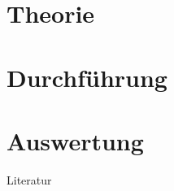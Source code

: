 \section{Theorie}

\section{Durchführung}

\section{Auswertung}

\parskip 340pt
\Large{Literatur}\\\\





